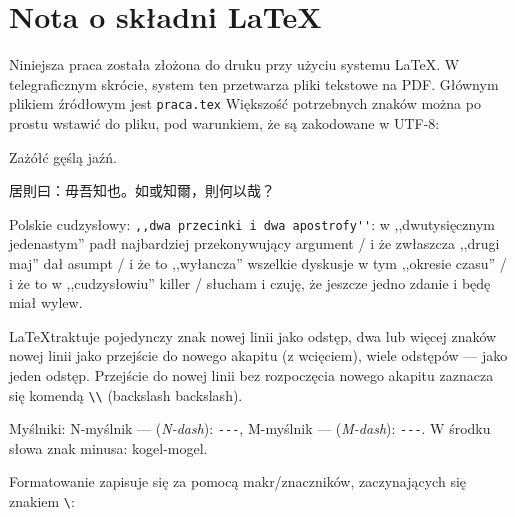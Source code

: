 \section{Nota o składni \LaTeX}
Niniejsza praca została złożona do druku przy użyciu systemu \LaTeX. W telegraficznym skrócie, system ten przetwarza pliki tekstowe na PDF. Głównym plikiem źródłowym jest \verb_praca.tex_ Większość potrzebnych znaków można po prostu wstawić do pliku, pod warunkiem, że są zakodowane w UTF-8:

Zażółć gęślą jaźń.

居則曰：毋吾知也。如或知爾，則何以哉？

Polskie cudzysłowy: \verb_,,dwa przecinki i dwa apostrofy''_: w ,,dwutysięcznym jedenastym'' padł najbardziej przekonywujący argument / i że zwłaszcza ,,drugi maj'' dał asumpt / i że to ,,wyłancza'' wszelkie dyskusje w tym ,,okresie czasu'' / i że to w ,,cudzysłowiu'' killer / słucham i czuję, że jeszcze jedno zdanie i będę miał wylew.

\LaTeX traktuje pojedynczy znak nowej linii jako odstęp, dwa lub więcej znaków nowej linii jako przejście do nowego akapitu (z wcięciem), wiele odstępów --- jako jeden odstęp. Przejście do nowej linii bez rozpoczęcia nowego akapitu zaznacza się komendą \verb_\\_ (backslash backslash).

Myślniki: N-myślnik --- (\textit{N-dash}): \verb_---_, M-myślnik --- (\textit{M-dash}): \verb_---_. W środku słowa znak minusa: kogel-mogel.

Formatowanie zapisuje się za pomocą makr/znaczników, zaczynających się znakiem \verb_\_:

